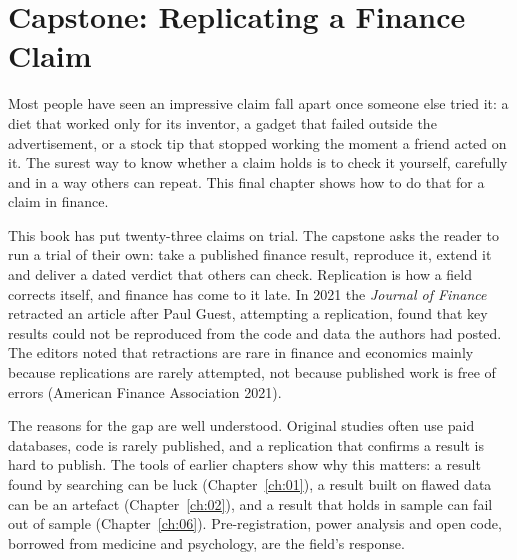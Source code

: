 \makeatletter
{}
\makeatother

\makeatletter
\makeatother

\chapter{Capstone: Replicating a Finance Claim}
\label{ch:24}

Most people have seen an impressive claim fall apart once someone else tried it: a diet that worked only for its inventor, a gadget that failed outside the advertisement, or a stock tip that stopped working the moment a friend acted on it. The surest way to know whether a claim holds is to check it yourself, carefully and in a way others can repeat. This final chapter shows how to do that for a claim in finance.

This book has put twenty-three claims on trial. The capstone asks the reader to run a trial of their own: take a published finance result, reproduce it, extend it and deliver a dated verdict that others can check. Replication is how a field corrects itself, and finance has come to it late. In 2021 the \emph{Journal of Finance} retracted an article after Paul Guest, attempting a replication, found that key results could not be reproduced from the code and data the authors had posted. The editors noted that retractions are rare in finance and economics mainly because replications are rarely attempted, not because published work is free of errors (American Finance Association 2021).

The reasons for the gap are well understood. Original studies often use paid databases, code is rarely published, and a replication that confirms a result is hard to publish. The tools of earlier chapters show why this matters: a result found by searching can be luck (Chapter~\ref{ch:01}), a result built on flawed data can be an artefact (Chapter~\ref{ch:02}), and a result that holds in sample can fail out of sample (Chapter~\ref{ch:06}). Pre-registration, power analysis and open code, borrowed from medicine and psychology, are the field's response.

